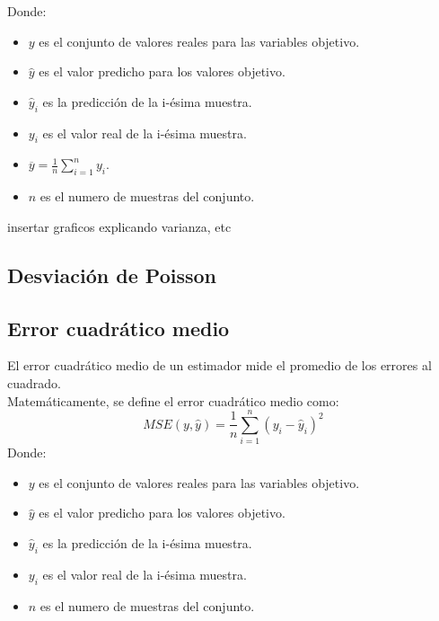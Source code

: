 Donde:
\begin{itemize}
	\item $y$ es el conjunto de valores reales para las variables objetivo.
	\item $\hat{y}$ es el valor predicho para los valores objetivo.
	\item $\hat{y}_i$ es la predicción de la i-ésima muestra.
	\item $y_i$ es el valor real de la i-ésima muestra.
	\item $\overline{y} = \frac{1}{n} \sum_{i=1}^{n} y_i$.
	\item $n$ es el numero de muestras del conjunto.
\end{itemize}
insertar graficos explicando varianza, etc
\subsection{Desviación de Poisson}
\subsection{Error cuadrático medio}
El error cuadrático medio de un estimador mide el promedio de los errores al cuadrado.\\
Matemáticamente, se define el error cuadrático medio como:
\[
	MSE(y,\hat{y}) = \frac{1}{n} \sum_{i=1}^{n} (y_i - \hat{y}_i) ^2
\]
Donde:
\begin{itemize}
	\item $y$ es el conjunto de valores reales para las variables objetivo.
	\item $\hat{y}$ es el valor predicho para los valores objetivo.
	\item $\hat{y}_i$ es la predicción de la i-ésima muestra.
	\item $y_i$ es el valor real de la i-ésima muestra.
	\item $n$ es el numero de muestras del conjunto.
\end{itemize}

